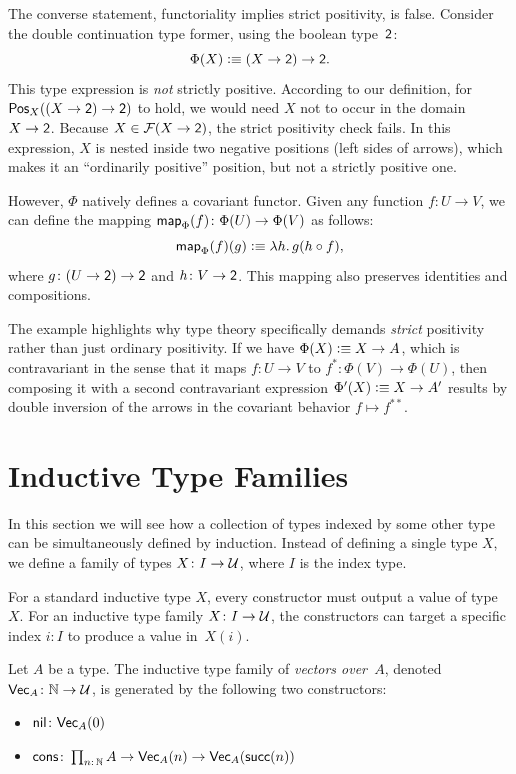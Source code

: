 \begin{xmpl}
    The converse statement, functoriality implies strict positivity, is false. Consider the double continuation type former, using the boolean type~$\mathsf{2}$:
    \[
        \Phi(X)\mathrel{\vcentcolon}\equiv(X\to\mathsf{2})\to\mathsf{2}.
    \]
    This type expression is \textit{not} strictly positive. According to our definition, for $\mathsf{Pos}_X((X \to \mathsf{2}) \to \mathsf{2})$ to hold, we would need $X$ not to occur in the domain $X \to \mathsf{2}$. Because $X \in \mathcal F(X \to \mathsf{2})$, the strict positivity check fails. In this expression, $X$ is nested inside two negative positions (left sides of arrows), which makes it an ``ordinarily positive'' position, but not a strictly positive one.

    However, $\Phi$ natively defines a covariant functor. Given any function $f\colon U \to V$, we can define the mapping $\fun{map}_\Phi(f)\colon \Phi(U) \to \Phi(V)$ as follows:
    \[
        \mathsf{map}_\Phi(f)(g)\mathrel{\vcentcolon}\equiv\lambda h.\,g(h \circ f),
    \]
    where $g\colon (U \to \fun2) \to \fun2$ and $h\colon V \to \fun2$. This mapping also preserves identities and compositions.
\end{xmpl}

\begin{rem}
    The example highlights why type theory specifically demands \textit{strict} positivity rather than just ordinary positivity. If we have $\Phi(X)\mathrel{\vcentcolon}\equiv X\to A$, which is contravariant in the sense that it maps $f\colon U\to V$ to $f^*\colon\Phi(V)\to\Phi(U)$, then composing it with a second contravariant expression $\Phi'(X)\mathrel{\vcentcolon}\equiv X\to A'$ results by double inversion of the arrows in the covariant behavior $f\mapsto f^{**}$.
\end{rem}

\section{Inductive Type Families}

In this section we will see how a collection of types indexed by some other type can be simultaneously defined by induction. Instead of defining a single type $X$, we define a family of types $X\colon I\to\univ$, where $I$ is the index type.

For a standard inductive type $X$, every constructor must output a value of type~$X$. For an inductive type family $X\colon I\to\univ$, the constructors can target a specific index $i\colon I$ to produce a value in~$X(i)$.

\begin{xmpl}\label{xmpl:Vec_A}
    Let $A$ be a type. The inductive type family of \textsl{vectors over~$A$}, denoted $\fun{Vec}_A \colon \N \to \univ$, is generated by the following two constructors:
    \begin{itemize}
        \item $\fun{nil} \colon \fun{Vec}_A(0)$
        \item $\fun{cons} \colon \prod_{n\colon\N} A \to \fun{Vec}_A(n) \to \fun{Vec}_A(\fun{succ}(n))$
    \end{itemize}
\end{xmpl}

